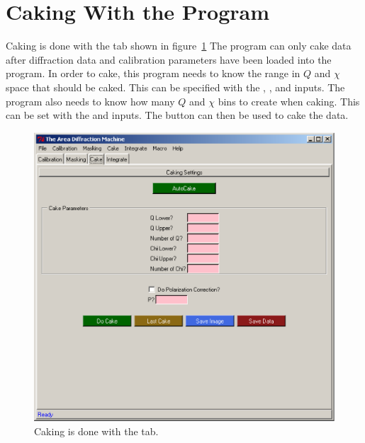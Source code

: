 \section{Caking With the Program}

Caking is done with the  tab shown in figure~\ref{caking_tab}
The program can only cake data after diffraction data and calibration
parameters have been loaded into the program.
In order to cake, this program needs to know the range
in $Q$ and $\chi$ space that should be caked. 
This can be specified with the , 
, and  inputs.
The program also needs to know how many $Q$ and $\chi$ bins to 
create when caking. This can be set
with the  and  inputs.
The  button can then be used to cake the data. 

\begin{figure}
    \centering
    \includegraphics[scale=.75]{figures/caking_tab.eps}
    \caption{Caking is done with the  tab.} 
    \label{caking_tab}
\end{figure}

